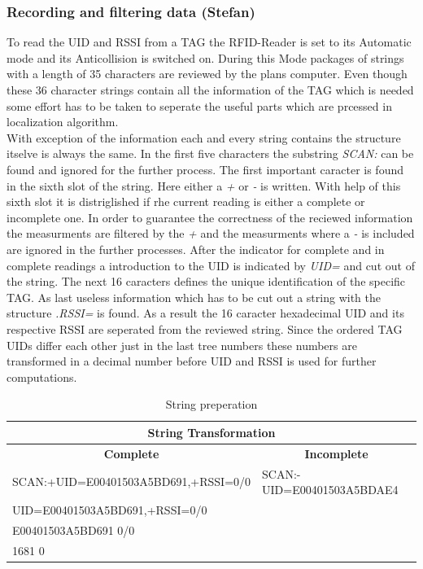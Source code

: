 \subsubsection{Recording and filtering data (Stefan)}
To read the UID and RSSI from a TAG the RFID-Reader is set to its Automatic mode and its Anticollision is switched on. During this Mode packages of strings with a length of 35 characters are reviewed by the plans computer. Even though these 36 character strings contain all the information of the TAG which is needed some effort has to be taken to seperate the useful parts which are prcessed in localization algorithm.\\
With exception of the information each and every string contains the structure itselve is always the same. In the first five characters the substring \textit{SCAN:} can be found and ignored for the further process. The first important caracter is found in the sixth slot of the string. Here either a \textit{+} or \textit{-} is written. With help of this sixth slot it is distriglished if rhe current reading is either a complete or incomplete one. In order to guarantee the correctness of the reciewed information the measurments are filtered by the \textit{+} and the measurments where a \textit{-} is included are ignored in the further processes. After the indicator for complete and in complete readings a introduction to the UID is indicated by \textit{UID=} and cut out of the string. The next 16 caracters defines the unique identification of the specific TAG. As last useless information which has to be cut out a string with the structure \textit{.RSSI=} is found. As a result the 16 caracter hexadecimal UID and its respective RSSI are seperated from the reviewed string. Since the ordered TAG UIDs differ each other just in the last tree numbers these numbers are transformed in a decimal number before UID and RSSI is used for further computations.\\
\begin{table}[]
\centering
\begin{tabular}{|l|l|}
\hline
\multicolumn{2}{|c|}{\textbf{String Transformation}}                               \\ \hline
\multicolumn{1}{|c|}{\textbf{Complete}} & \multicolumn{1}{c|}{\textbf{Incomplete}} \\ \hline
SCAN:+UID=E00401503A5BD691,+RSSI=0/0    & SCAN:-UID=E00401503A5BDAE4               \\ \hline
UID=E00401503A5BD691,+RSSI=0/0          &                                          \\ \hline
E00401503A5BD691 0/0                    &                                          \\ \hline
1681 0                                  &                                          \\ \hline
\end{tabular}
\caption{String preperation}
\label{string_prep}
\end{table}


